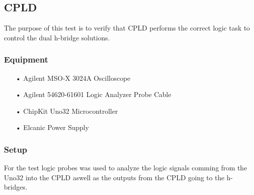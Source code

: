 \subsection{CPLD}
The purpose of this test is to verify that CPLD performs the correct logic task to control the dual h-bridge solutions.
\subsubsection{Equipment}
\begin{enumerate}
	\item[•]Agilent MSO-X 3024A Oscilloscope
	\item[•]Agilent 54620-61601 Logic Analyzer Probe Cable
	\item[•]ChipKit Uno32 Microcontroller
	\item[•]Elcanic Power Supply
\end{enumerate}

\subsubsection{Setup}
For the test logic probes was used to analyze the logic signals comming from the Uno32 into the CPLD aswell as the outputs from the CPLD going to the h-bridges.

